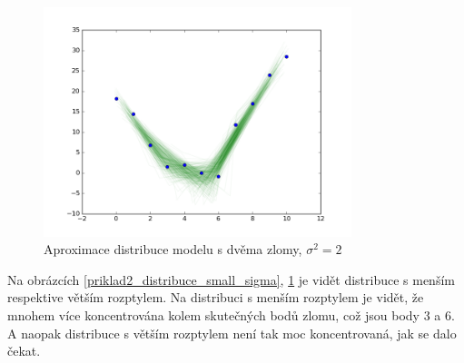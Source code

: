 \documentclass[czech,master,public,dept470,male,cpdeclaration,oneside, python]{diploma}
\begin{document}
\begin{figure}
	[H]\centering\includegraphics[width=0.8\textwidth]{images/distribution_lines_u_2breaks_bigger_variance.png}\caption{Aproximace distribuce modelu s dvěma zlomy, $\sigma^2 = 2$}\label{priklad2_distribuce_big_sigma}
\end{figure}
Na obrázcích \ref{priklad2_distribuce_small_sigma}, \ref{priklad2_distribuce_big_sigma} je vidět distribuce s menším respektive větším rozptylem. Na distribuci s menším rozptylem je vidět, že mnohem více koncentrována kolem skutečných bodů zlomu, což jsou body 3 a 6. A naopak distribuce s větším rozptylem není tak moc koncentrovaná, jak se dalo čekat.
\end{document}

